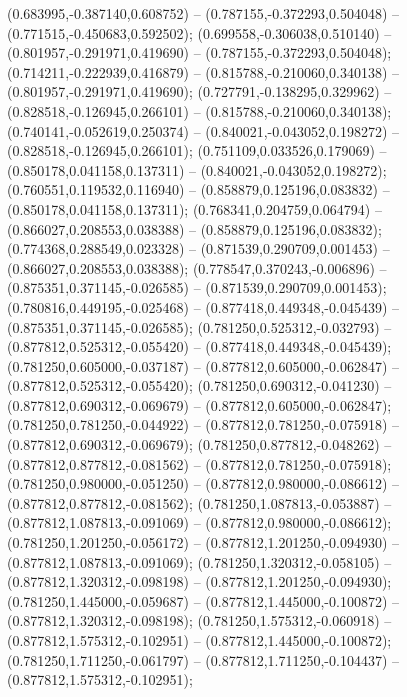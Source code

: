  (0.683995,-0.387140,0.608752) -- (0.787155,-0.372293,0.504048) -- (0.771515,-0.450683,0.592502);
 (0.699558,-0.306038,0.510140) -- (0.801957,-0.291971,0.419690) -- (0.787155,-0.372293,0.504048);
 (0.714211,-0.222939,0.416879) -- (0.815788,-0.210060,0.340138) -- (0.801957,-0.291971,0.419690);
 (0.727791,-0.138295,0.329962) -- (0.828518,-0.126945,0.266101) -- (0.815788,-0.210060,0.340138);
 (0.740141,-0.052619,0.250374) -- (0.840021,-0.043052,0.198272) -- (0.828518,-0.126945,0.266101);
 (0.751109,0.033526,0.179069) -- (0.850178,0.041158,0.137311) -- (0.840021,-0.043052,0.198272);
 (0.760551,0.119532,0.116940) -- (0.858879,0.125196,0.083832) -- (0.850178,0.041158,0.137311);
 (0.768341,0.204759,0.064794) -- (0.866027,0.208553,0.038388) -- (0.858879,0.125196,0.083832);
 (0.774368,0.288549,0.023328) -- (0.871539,0.290709,0.001453) -- (0.866027,0.208553,0.038388);
 (0.778547,0.370243,-0.006896) -- (0.875351,0.371145,-0.026585) -- (0.871539,0.290709,0.001453);
 (0.780816,0.449195,-0.025468) -- (0.877418,0.449348,-0.045439) -- (0.875351,0.371145,-0.026585);
 (0.781250,0.525312,-0.032793) -- (0.877812,0.525312,-0.055420) -- (0.877418,0.449348,-0.045439);
 (0.781250,0.605000,-0.037187) -- (0.877812,0.605000,-0.062847) -- (0.877812,0.525312,-0.055420);
 (0.781250,0.690312,-0.041230) -- (0.877812,0.690312,-0.069679) -- (0.877812,0.605000,-0.062847);
 (0.781250,0.781250,-0.044922) -- (0.877812,0.781250,-0.075918) -- (0.877812,0.690312,-0.069679);
 (0.781250,0.877812,-0.048262) -- (0.877812,0.877812,-0.081562) -- (0.877812,0.781250,-0.075918);
 (0.781250,0.980000,-0.051250) -- (0.877812,0.980000,-0.086612) -- (0.877812,0.877812,-0.081562);
 (0.781250,1.087813,-0.053887) -- (0.877812,1.087813,-0.091069) -- (0.877812,0.980000,-0.086612);
 (0.781250,1.201250,-0.056172) -- (0.877812,1.201250,-0.094930) -- (0.877812,1.087813,-0.091069);
 (0.781250,1.320312,-0.058105) -- (0.877812,1.320312,-0.098198) -- (0.877812,1.201250,-0.094930);
 (0.781250,1.445000,-0.059687) -- (0.877812,1.445000,-0.100872) -- (0.877812,1.320312,-0.098198);
 (0.781250,1.575312,-0.060918) -- (0.877812,1.575312,-0.102951) -- (0.877812,1.445000,-0.100872);
 (0.781250,1.711250,-0.061797) -- (0.877812,1.711250,-0.104437) -- (0.877812,1.575312,-0.102951);
